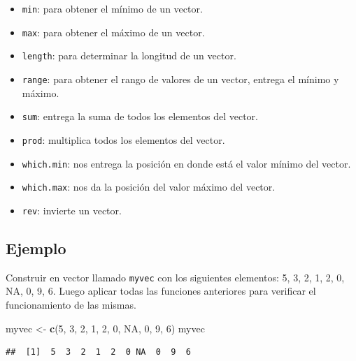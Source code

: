 \documentclass[10pt,]{krantz}
\makeatletter
\newenvironment{Shaded}{\begin{snugshade}}{\end{snugshade}}
\newcommand{\KeywordTok}[1]{\textcolor[rgb]{0.13,0.29,0.53}{\textbf{{#1}}}}
\newcommand{\DecValTok}[1]{\textcolor[rgb]{0.00,0.00,0.81}{{#1}}}
\newcommand{\StringTok}[1]{\textcolor[rgb]{0.31,0.60,0.02}{{#1}}}
\newcommand{\OtherTok}[1]{\textcolor[rgb]{0.56,0.35,0.01}{{#1}}}
\newcommand{\NormalTok}[1]{{#1}}
\providecommand{\tightlist}{%
  \setlength{\itemsep}{0pt}\setlength{\parskip}{0pt}}
\newenvironment{kframe}{%
\medskip{}
\setlength{\fboxsep}{.8em}
 \def\at@end@of@kframe{}%
 \ifinner\ifhmode%
  \def\at@end@of@kframe{\end{minipage}}%
  \begin{minipage}{\columnwidth}%
 \fi\fi%
 \def\FrameCommand##1{\hskip\@totalleftmargin \hskip-\fboxsep
 \colorbox{shadecolor}{##1}\hskip-\fboxsep
     \hskip-\linewidth \hskip-\@totalleftmargin \hskip\columnwidth}%
 \MakeFramed {\advance\hsize-\width
   \@totalleftmargin\z@ \linewidth\hsize
   \@setminipage}}%
 {\par\unskip\endMakeFramed%
 \at@end@of@kframe}
\renewenvironment{Shaded}{\begin{kframe}}{\end{kframe}}
\makeatother
\begin{document}
    
  

\begin{itemize}
\tightlist
\item
  \texttt{min}: para obtener el mínimo de un vector.
\item
  \texttt{max}: para obtener el máximo de un vector.
\item
  \texttt{length}: para determinar la longitud de un vector.
\item
  \texttt{range}: para obtener el rango de valores de un vector, entrega
  el mínimo y máximo.
\item
  \texttt{sum}: entrega la suma de todos los elementos del vector.
\item
  \texttt{prod}: multiplica todos los elementos del vector.
\item
  \texttt{which.min}: nos entrega la posición en donde está el valor
  mínimo del vector.
\item
  \texttt{which.max}: nos da la posición del valor máximo del vector.
\item
  \texttt{rev}: invierte un vector.
\end{itemize}

\subsection*{Ejemplo}\label{ejemplo-9}


Construir en vector llamado \texttt{myvec} con los siguientes elementos:
5, 3, 2, 1, 2, 0, NA, 0, 9, 6. Luego aplicar todas las funciones
anteriores para verificar el funcionamiento de las mismas.

\begin{Shaded}
\begin{Highlighting}[]
\NormalTok{myvec <-}\StringTok{ }\KeywordTok{c}\NormalTok{(}\DecValTok{5}\NormalTok{, }\DecValTok{3}\NormalTok{, }\DecValTok{2}\NormalTok{, }\DecValTok{1}\NormalTok{, }\DecValTok{2}\NormalTok{, }\DecValTok{0}\NormalTok{, }\OtherTok{NA}\NormalTok{, }\DecValTok{0}\NormalTok{, }\DecValTok{9}\NormalTok{, }\DecValTok{6}\NormalTok{)}
\NormalTok{myvec}
\end{Highlighting}
\end{Shaded}

\begin{verbatim}
##  [1]  5  3  2  1  2  0 NA  0  9  6
\end{verbatim}
\end{document}
